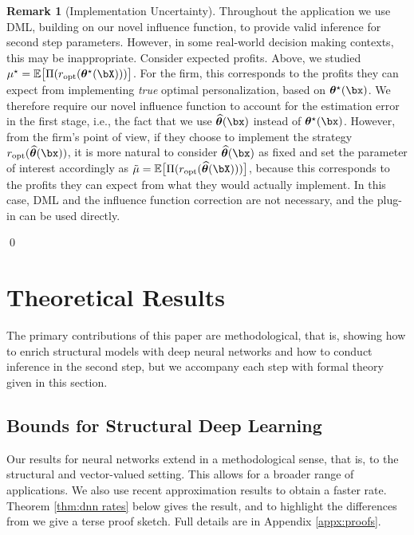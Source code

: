 \documentclass[12pt]{article}
\numberwithin{equation}{section}
\theoremstyle{definition}
\newtheorem{remarkTmp}{Remark}
\newenvironment{remark}
	{\medskip  \begin{remarkTmp} 	}
	{ 
		\renewcommand{\qedsymbol}{$\clubsuit$}
		\qed 
		\end{remarkTmp} 
	}
\newcommand{\E}{\mathbb{E}}
\newcommand{\btheta}{\boldsymbol{\theta}}
\newcommand{\mtrue}{\mu^\star}
\newcommand{\bttrue}{\btheta^\star}
\newcommand{\ropt}{r_{\rm{opt}}}
\newcommand{\bthat}{\bm{\widehat{\theta}}}
\begin{document}
\begin{remark}[Implementation Uncertainty]
    \label{rem:implementation uncertainty}
    Throughout the application we use DML, building on our novel influence function, to provide valid inference for second step parameters. However, in some real-world decision making contexts, this may be inappropriate. Consider expected profits. Above, we studied $\mtrue = \E\big[\Pi(\ropt(\bttrue(\bX))) \big]$. For the firm, this corresponds to the profits they can expect from implementing \emph{true} optimal personalization, based on $\bttrue(\bx)$. We therefore require our novel influence function to account for the estimation error in the first stage, i.e., the fact that we use $\bthat(\bx)$ instead of $\bttrue(\bx)$. However, from the firm's point of view, if they choose to implement the strategy $\ropt(\bthat(\bx))$, it is more natural to consider $\bthat(\bx)$ as fixed and set the parameter of interest accordingly as $\tilde{\mu} = \E\big[\Pi(\ropt(\bthat(\bX))) \big]$, because this corresponds to the profits they can expect from what they would actually implement. In this case, DML and the influence function correction are not necessary, and the plug-in can be used directly.
\end{remark}








\section{Theoretical Results}
	\label{sec:theory}

The primary contributions of this paper are methodological, that is, showing how to enrich structural models with deep neural networks and how to conduct inference in the second step, but we accompany each step with formal theory given in this section.


\subsection{Bounds for Structural Deep Learning}
	\label{sec:dnn theory}

Our results for neural networks extend \cite{Farrell-Liang-Misra2021_Ecma} in a methodological sense, that is, to the structural and vector-valued setting. This allows for a broader range of applications. We also use recent approximation results to obtain a faster rate. Theorem \ref{thm:dnn rates} below gives the result, and to highlight the differences from \cite{Farrell-Liang-Misra2021_Ecma} we give a terse proof sketch. Full details are in Appendix \ref{appx:proofs}.
\end{document}
